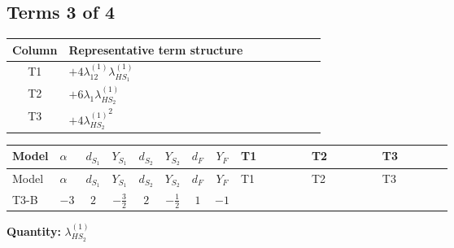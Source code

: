 \documentclass[8pt]{article}
\begin{document}
\begin{landscape}
\subsection*{Terms 3 of 4}
\begin{center}
\begin{tabular}{@{}c >{\raggedright\arraybackslash}p{0.82\linewidth}@{}}
\toprule
Column & Representative term structure \\
\midrule
T1 & \(\displaystyle +4 {\lambda_{12}^{(1)}} {\lambda_{HS_1}^{(1)}}\) \\
\midrule
T2 & \(\displaystyle +6 {\lambda_1} {\lambda_{HS_2}^{(1)}}\) \\
\midrule
T3 & \(\displaystyle +4 {\lambda_{HS_2}^{(1)}}^2\) \\
\midrule
\bottomrule
\end{tabular}
\end{center}
\smallskip
\tiny
\begin{longtable}{@{}llcccccc >{\raggedright\arraybackslash}p{0.21\linewidth} >{\raggedright\arraybackslash}p{0.21\linewidth} >{\raggedright\arraybackslash}p{0.21\linewidth}@{}}
\toprule
Model & $\alpha$ & $d_{S_1}$ & $Y_{S_1}$ & $d_{S_2}$ & $Y_{S_2}$ & $d_F$ & $Y_F$ & T1 & T2 & T3 \\
\midrule
\endfirsthead
\toprule
Model & $\alpha$ & $d_{S_1}$ & $Y_{S_1}$ & $d_{S_2}$ & $Y_{S_2}$ & $d_F$ & $Y_F$ & T1 & T2 & T3 \\
\midrule
\endhead
T3-B & $-3$ & $2$ & $-\frac{3}{2}$ & $2$ & $-\frac{1}{2}$ & $1$ & $-1$ & \scriptsize\adjustbox{max width=\linewidth}{$\begin{gathered} +4 {\lambda_{12}^{(1)}} {\lambda_{HS_1}^{(1)}}\end{gathered}$} & \scriptsize\adjustbox{max width=\linewidth}{$\begin{gathered} +6 {\lambda_1} {\lambda_{HS_2}^{(1)}}\end{gathered}$} & \scriptsize\adjustbox{max width=\linewidth}{$\begin{gathered} +4 {\lambda_{HS_2}^{(1)}}^2\end{gathered}$} \\
\midrule
\bottomrule
\end{longtable}
\clearpage
\noindent\textbf{Quantity: }$\lambda_{HS_2}^{(1)}$\par\smallskip

\end{landscape}
\end{document}
